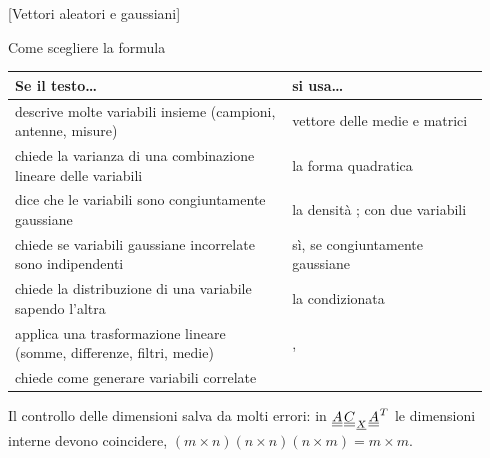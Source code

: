 [Vettori aleatori e gaussiani]

\begin{scelta}{Come scegliere la formula}
\renewcommand{\arraystretch}{1.25}
\begin{tabular}{@{}P{0.55\linewidth}P{0.39\linewidth}@{}}
  \toprule
  \textbf{Se il testo\ldots} & \textbf{si usa\ldots} \\
  \midrule
  descrive molte variabili insieme (campioni, antenne, misure) & vettore delle medie e matrici 
       \\
  chiede la varianza di una combinazione lineare delle variabili & la forma quadratica  \\
  dice che le variabili sono congiuntamente gaussiane & la densità ; con due variabili
     \\
  chiede se variabili gaussiane incorrelate sono indipendenti & sì, se congiuntamente gaussiane  \\
  chiede la distribuzione di una variabile sapendo l'altra & la condizionata  \\
  applica una trasformazione lineare (somme, differenze, filtri, medie) & ,  \\
  chiede come generare variabili correlate &  \\
  \bottomrule
\end{tabular}

Il controllo delle dimensioni salva da molti errori: in ${\mkern1mu\underline{\underline{A}}\mkern1mu}{\mkern1mu\underline{\underline{C}}\mkern1mu}_{{\mkern1mu\underline{X}\mkern1mu}}{\mkern1mu\underline{\underline{A}}\mkern1mu}^T$ le dimensioni interne
devono coincidere, $(m \times n)(n \times n)(n \times m) = m \times m$.
\end{scelta}



